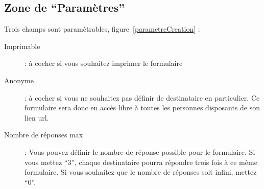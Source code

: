 \documentclass[a4paper,11pt,final]{report}
\begin{document}
\noindent\begin{minipage}{\linewidth}%
\label{pageCreation}
\end{minipage}

\subsection{Zone de ``Paramètres''}
Trois champs sont paramètrables, figure~\ref{parametreCreation} :
\begin{description}
	\item [Imprimable] : à cocher si vous souhaitez imprimer le formulaire
	\item [Anonyme] : à cocher si vous ne souhaitez pas définir de destinataire en particulier. Ce formulaire sera donc en accès libre à toutes les personnes disposants de son lien url.
	\item [Nombre de réponses max] : Vous pouvez définir le nombre de réponse possible pour le formulaire. Si vous mettez ``3'', chaque destinataire pourra répondre trois fois à ce même formulaire. Si vous souhaitez que le nombre de réponses soit infini, mettez ``0''.
\end{description}

\noindent\begin{minipage}{\linewidth}%
\label{parametreCreation}
\end{minipage}
\end{document}
